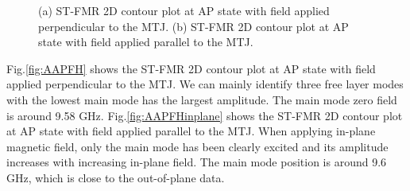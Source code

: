 \begin{figure}[!ht]
\centering
{}
\caption{(a) ST-FMR 2D contour plot at AP state with field applied perpendicular to the MTJ. (b) ST-FMR 2D contour plot at AP state with field applied parallel to the MTJ.}
\end{figure}

Fig.\ref{fig:AAPFH} shows the ST-FMR 2D contour plot at AP state with field applied perpendicular to the MTJ. We can mainly identify three free layer modes with the lowest main mode has the largest amplitude. The main mode zero field is around 9.58 GHz. Fig.\ref{fig:AAPFHinplane} shows the ST-FMR 2D contour plot at AP state with field applied parallel to the MTJ. When applying in-plane magnetic field, only the main mode has been clearly excited and its amplitude increases with increasing in-plane field. The main mode position is around 9.6 GHz, which is close to the out-of-plane data.

